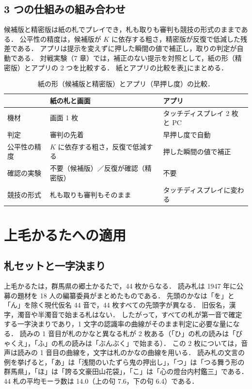 \subsection{3 つの仕組みの組み合わせ}

候補版と精密版は紙の札でプレイでき，札も取りも審判も競技の形式のままである．
公平性の精度は，候補版が $K$ に依存する粗さ，精密版が反復で低減した残差である．
アプリは提示を変えずに押した瞬間の値で補正し，取りの判定が自動である．
対戦実験（7 章）では，補正のない提示を対照として，紙の形（精密版）とアプリの 2 つを比較する．
紙とアプリの比較を表\ref{tab:paper_app}にまとめる．

\begin{table}[tb]
\caption{紙の形（候補版と精密版）とアプリ（早押し度）の比較．}
\label{tab:paper_app}
\centering
\footnotesize
\begin{tabular}{p{1.6cm}p{3.0cm}p{2.6cm}}
\hline\hline
 & 紙の札と画面 & アプリ \\
\hline
機材 & 画面 1 枚 & タッチディスプレイ 2 枚と PC \\
判定 & 審判の先着 & 早押し度で自動 \\
公平性の精度 & $K$ に依存する粗さ，反復で低減する & 押した瞬間の値で補正 \\
確認の実験 & 不要（候補版）／反復が確認（精密版） & 不要 \\
競技の形式 & 札も取りも審判もそのまま & タッチディスプレイに変わる \\
\hline
\end{tabular}
\end{table}

\section{上毛かるたへの適用}

\subsection{札セットと一字決まり}

上毛かるたは，群馬県の郷土かるたで，44 枚からなる．
読み札は 1947 年に公募の題材を 18 人の編纂委員がまとめたものである．
先頭のかなは「を」と「ん」を除く現代仮名 44 音で，44 枚すべての先頭字が異なる．
旧仮名，漢字，濁音や半濁音で始まる札はない．
したがって，すべての札が第一音で確定する一字決まりであり，1 文字の認識率の曲線がそのまま判定に必要な量になる．
読みの 1 音目が札のかなと異なる札が 2 枚ある（「ひ」の札の読みは「びゃくえ」，「ふ」の札の読みは「ぶんぶく」で始まる）．
この 2 枚については，音声は読みの 1 音目の曲線を，文字は札のかなの曲線を用いる．
読み札の文言の例を挙げると，「あ」は「浅間のいたずら鬼の押出し」，「つ」は「つる舞う形の群馬県」，「ほ」は「誇る文豪田山花袋」，「こ」は「心の燈台内村鑑三」である．
44 札の平均モーラ数は 14.0（上の句 7.6，下の句 6.4）である．

